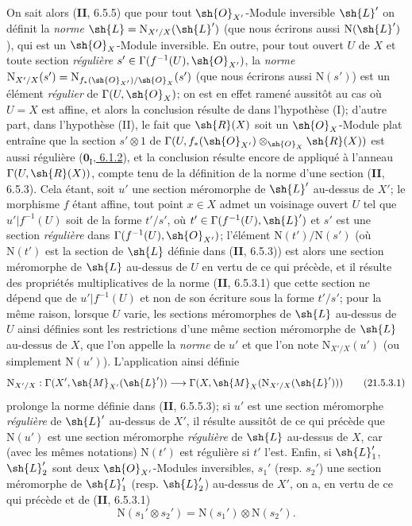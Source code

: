 \begin{env}[21.5.3]
On sait alors (\textbf{II}, 6.5.5) que pour tout $\sh{O}_{X'}$-Module inversible $\sh{L}'$ on définit la \emph{norme} $\sh{L}=\mathrm{N}_{X'/X}(\sh{L}')$ (que nous écrirons aussi $\mathrm{N}(\sh{L}')$), qui est un $\sh{O}_X$-Module inversible.
En outre, pour tout ouvert $U$ de $X$ et toute section \emph{régulière} $s'\in\Gamma(f^{-1}(U),\sh{O}_{X'})$, la \emph{norme} $\mathrm{N}_{X'/X}(s')=\mathrm{N}_{f_*(\sh{O}_{X'})/\sh{O}_X}(s')$ (que nous écrirons aussi $\mathrm{N}(s')$) est un élément \emph{régulier} de $\Gamma(U,\sh{O}_X)$;
on est en effet ramené aussitôt au cas où $U=X$ est affine, et alors la conclusion résulte de  dans l'hypothèse (I);
d'autre part, dans l'hypothèse (II), le fait que $\sh{R}(X)$ soit un $\sh{O}_X$-Module plat entraîne que la section $s'\otimes1$ de $\Gamma(U,f_*(\sh{O}_{X'})\otimes_{\sh{O}_X}\sh{R}(X))$ est aussi régulière (\hyperref[0.6.1.2]{$\mathbf{0}_{\mathrm I}$, 6.1.2}), et la conclusion résulte encore de  appliqué à l'anneau $\Gamma(U,\sh{R}(X))$, compte tenu de la définition de la norme d'une section (\textbf{II}, 6.5.3).
Cela étant, soit $u'$ une section méromorphe de $\sh{L}'$ au-dessus de $X'$;
le morphisme $f$ étant affine, tout point $x\in X$ admet un voisinage ouvert $U$ tel que $u'|f^{-1}(U)$ soit de la forme $t'/s'$, où $t'\in\Gamma(f^{-1}(U),\sh{L}')$ et $s'$ est une section \emph{régulière} dans $\Gamma(f^{-1}(U),\sh{O}_{X'})$;
l'élément $\mathrm{N}(t')/\mathrm{N}(s')$ (où $\mathrm{N}(t')$ est la section de $\sh{L}$ définie dans (\textbf{II}, 6.5.3)) est alors une section méromorphe de $\sh{L}$ au-dessus de $U$ en vertu de ce qui précède, et il résulte des propriétés multiplicatives de la norme (\textbf{II}, 6.5.3.1) que cette section ne dépend que de $u'|f^{-1}(U)$ et non de son écriture sous la forme $t'/s'$;
pour la même raison, lorsque $U$ varie, les sections méromorphes de $\sh{L}$ au-dessus de $U$ ainsi définies sont les restrictions d'une même section méromorphe de $\sh{L}$ au-dessus de $X$, que l'on appelle la \emph{norme} de $u'$ et que l'on note $\mathrm{N}_{X'/X}(u')$ (ou simplement $\mathrm{N}(u')$).
L'application ainsi définie
\[
\label{IV.21.5.3.1}
  \mathrm{N}_{X'/X}:\Gamma(X',\sh{M}_{X'}(\sh{L}'))\to\Gamma(X,\sh{M}_X(\mathrm{N}_{X'/X}(\sh{L}')))
  \tag{21.5.3.1}
\]
prolonge la norme définie dans (\textbf{II}, 6.5.5.3);
si $u'$ est une section méromorphe \emph{régulière} de $\sh{L}'$ au-dessus de $X'$, il résulte aussitôt de ce qui précède que $\mathrm{N}(u')$ est une section méromorphe \emph{régulière} de $\sh{L}$ au-dessus de $X$, car (avec les mêmes notations) $\mathrm{N}(t')$ est régulière si $t'$ l'est.
Enfin, si $\sh{L}_1'$, $\sh{L}_2'$ sont deux $\sh{O}_{X'}$-Modules inversibles, $s_1'$ (resp. $s_2'$) une section méromorphe de $\sh{L}_1'$ (resp. $\sh{L}_2'$) au-dessus de $X'$, on a, en vertu de ce qui précède et de (\textbf{II}, 6.5.3.1)
\[
\label{IV.21.5.3.2}
  \mathrm{N}(s_1'\otimes s_2')=\mathrm{N}(s_1')\otimes\mathrm{N}(s_2').
  \tag{21.5.3.2}
\]
\end{env}

